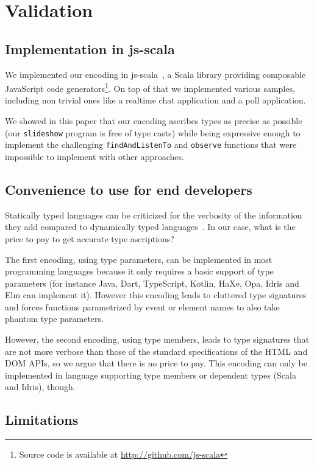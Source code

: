 \documentclass{llncs}
\newcommand{\jscode}[1]{\lstinline[language=JavaScript]|#1|}
\newcommand{\scalacode}[1]{\lstinline[language=Scala]|#1|}
\begin{document}
\section{Validation}
\label{sec-validation}

\subsection{Implementation in js-scala}

We implemented our encoding in js-scala~\cite{Kossakowski12_JsDESL}, a Scala library providing composable JavaScript code generators\footnote{Source code is available at \href{http://github.com/js-scala}{http://github.com/js-scala}}. On top of that we implemented various samples, including non trivial ones like a realtime chat application and a poll application.

We showed in this paper that our encoding ascribes types as precise as possible (our \scalacode{slideshow} program is free of type casts) while being expressive enough to implement the challenging \jscode{findAndListenTo} and \jscode{observe} functions that were impossible to implement with other approaches.

\subsection{Convenience to use for end developers}

Statically typed languages can be criticized for the verbosity of the information they add compared to dynamically typed languages~\cite{meijer2004static}. In our case, what is the price to pay to get accurate type ascriptions?

The first encoding, using type parameters, can be implemented in most programming languages because it only requires a basic support of type parameters (for instance Java, Dart, TypeScript, Kotlin, HaXe, Opa, Idris and Elm can implement it). However this encoding leads to cluttered type signatures and forces functions parametrized by event or element names to also take phantom type parameters.

However, the second encoding, using type members, leads to type signatures that are not more verbose than those of the standard specifications of the HTML and DOM APIs, so we argue that there is no price to pay. This encoding can only be implemented in language supporting type members or dependent types (Scala and Idris), though.

\subsection{Limitations}
\end{document}
